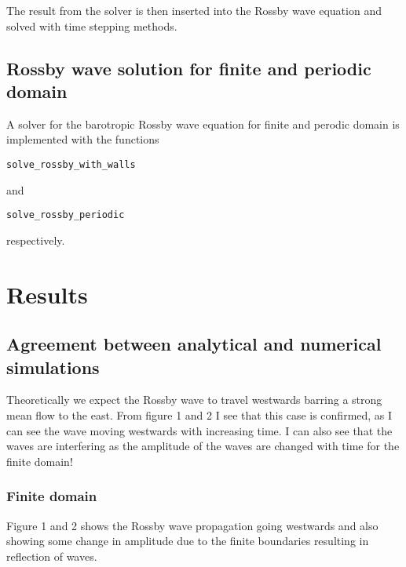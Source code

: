 The result from the solver is then inserted into the Rossby wave equation and solved with time stepping methods.

\subsection{Rossby wave solution for finite and periodic domain}
A solver for the barotropic Rossby wave equation for finite and perodic domain is implemented with the functions

\begin{verbatim}
solve_rossby_with_walls
\end{verbatim}

and

\begin{verbatim}
solve_rossby_periodic
\end{verbatim}

respectively.


 

\section{Results}

\subsection{Agreement between analytical and numerical simulations}

Theoretically we expect the Rossby wave to travel westwards barring a strong mean flow to the east. From figure 1 and 2 I see that this case is confirmed, as I can see the wave moving westwards with increasing time. I can also see that the waves are interfering as the amplitude of the waves are changed with time for the finite domain!

\subsubsection{Finite domain}
Figure 1 and 2 shows the Rossby wave propagation going westwards and also showing some change in amplitude due to the finite boundaries resulting in reflection of waves. 


